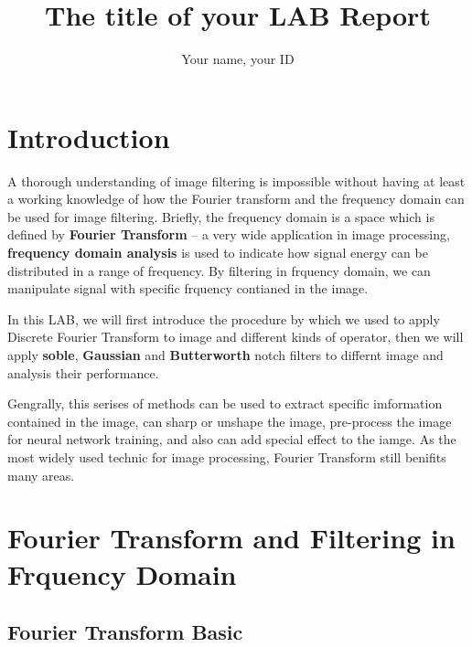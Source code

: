 \documentclass[
	12pt, %
]{style/fphw}
\title{The title of your LAB Report} %
\author{Your name, your ID} %
\institute{Southern University of Science and Technology \\ School of Microelectronic} %
\begin{document}
\maketitle %


\section*{Introduction}

A thorough understanding of image filtering is impossible without having at least a working knowledge of how the Fourier transform and the frequency domain can be used for image filtering. Briefly, the frequency domain is a space which is defined by \textbf{Fourier Transform} -- a very wide application in image processing, \textbf{frequency domain analysis} is used to indicate how signal energy can be distributed in a range of frequency. By filtering in frquency domain, we can manipulate signal with specific frquency contianed in the image.

In this LAB, we will first introduce the procedure by which we used to apply Discrete Fourier Transform to image and different kinds of operator, then we will apply \textbf{soble}, \textbf{Gaussian} and \textbf{Butterworth} notch filters to differnt image and analysis their performance.

Gengrally, this serises of methods can be used to extract specific imformation contained in the image, can sharp or unshape the image, pre-process the image for neural network training, and also can add special effect to the iamge. As the most widely used technic for image processing, Fourier Transform still benifits many areas.

\newpage

\section*{Fourier Transform and Filtering in Frquency Domain}

\subsection*{Fourier Transform Basic} \
\end{document}
